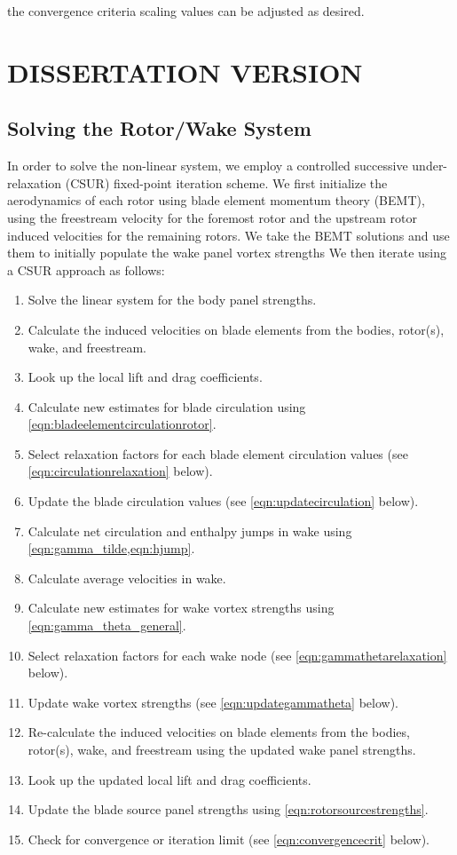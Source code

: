 \where the convergence criteria scaling values can be adjusted as desired.


\section{DISSERTATION VERSION}

\subsection{Solving the Rotor/Wake System}
\label{ssec:rotor_only_solver}


In order to solve the non-linear system, we employ a controlled successive under-relaxation (CSUR) fixed-point iteration scheme.
%
We first initialize the aerodynamics of each rotor using blade element momentum theory (BEMT), using the freestream velocity for the foremost rotor and the upstream rotor induced velocities for the remaining rotors.
%
We take the BEMT solutions and use them to initially populate the wake panel vortex strengths
%
We then iterate using a CSUR approach as follows:

\begin{enumerate}
    \item Solve the linear system for the body panel strengths.
    \item Calculate the induced velocities on blade elements from the bodies, rotor(s), wake, and freestream.
    \item Look up the local lift and drag coefficients.
    \item Calculate new estimates for blade circulation using \cref{eqn:bladeelementcirculationrotor}.
    \item Select relaxation factors for each blade element circulation values (see \cref{eqn:circulationrelaxation} below).
    \item Update the blade circulation values (see \cref{eqn:updatecirculation} below).
    \item Calculate net circulation and enthalpy jumps in wake using \cref{eqn:gamma_tilde,eqn:hjump}.
    \item Calculate average velocities in wake.
    \item Calculate new estimates for wake vortex strengths using \cref{eqn:gamma_theta_general}.
    \item Select relaxation factors for each wake node (see \cref{eqn:gammathetarelaxation} below).
    \item Update wake vortex strengths (see \cref{eqn:updategammatheta} below).
    \item Re-calculate the induced velocities on blade elements from the bodies, rotor(s), wake, and freestream using the updated wake panel strengths.
    \item Look up the updated local lift and drag coefficients.
    \item Update the blade source panel strengths using \cref{eqn:rotorsourcestrengths}.
    \item Check for convergence or iteration limit (see \cref{eqn:convergencecrit} below).
\end{enumerate}

